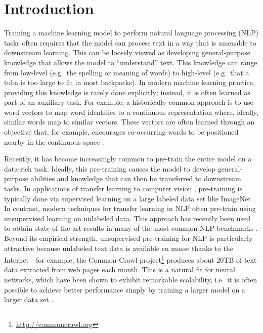 \documentclass[twoside,11pt]{article}
\begin{document}
\section{Introduction}

Training a machine learning model to perform natural language processing (NLP) tasks often requires that the model can process text in a way that is amenable to downstream learning.
This can be loosely viewed as developing general-purpose knowledge that allows the model to ``understand'' text.
This knowledge can range from low-level (e.g.\ the spelling or meaning of words) to high-level (e.g.\ that a tuba is too large to fit in most backpacks).
In modern machine learning practice, providing this knowledge is rarely done explicitly; instead, it is often learned as part of an auxiliary task.
For example, a historically common approach is to use word vectors \citep{mikolov2013distributed,mikolov2013efficient,pennington2014glove} to map word identities to a continuous representation where, ideally, similar words map to similar vectors.
These vectors are often learned through an objective that, for example, encourages co-occurring words to be positioned nearby in the continuous space \citep{mikolov2013distributed}.

Recently, it has become increasingly common to pre-train the entire model on a data-rich task.
Ideally, this pre-training causes the model to develop general-purpose abilities and knowledge that can then be transferred to downstream tasks.
In applications of transfer learning to computer vision \citep{oquab2014learning,jia2014caffe,huh2016makes,yosinski2014transferable}, pre-training is typically done via supervised learning on a large labeled data set like ImageNet \citep{russakovsky2015imagenet,deng2009imagenet}.
In contrast, modern techniques for transfer learning in NLP often pre-train using unsupervised learning on unlabeled data.
This approach has recently been used to obtain state-of-the-art results in many of the most common NLP benchmarks \citep{devlin2018bert,yang2019xlnet,dong2019unified,liu2019roberta,lan2019albert}.
Beyond its empirical strength, unsupervised pre-training for NLP is particularly attractive because unlabeled text data is available en masse thanks to the Internet---for example, the Common Crawl project\footnote{\url{http://commoncrawl.org}} produces about 20TB of text data extracted from web pages each month.
This is a natural fit for neural networks, which have been shown to exhibit remarkable scalability, i.e.\ it is often possible to achieve better performance simply by training a larger model on a larger data set \citep{hestness2017deep,shazeer2017outrageously,jozefowicz2016exploring,mahajan2018exploring,radford2019language,shazeer2018mesh,huang2018gpipe,keskar2019ctrl}.
\end{document}
